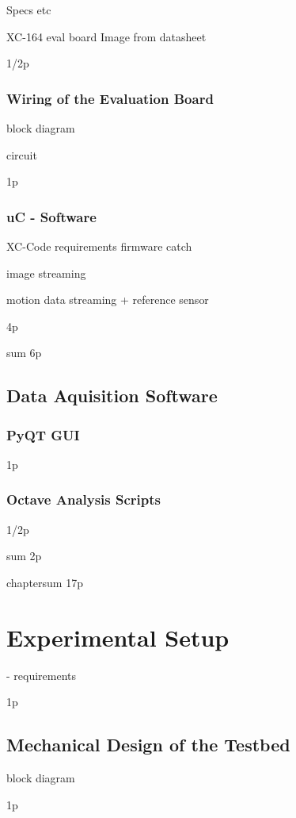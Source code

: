 \documentclass[12pt,a4paper]{article}
\begin{document}
Specs etc

XC-164 eval board 
  Image from datasheet

1/2p

\subsubsection{Wiring of the Evaluation Board}

  block diagram

  circuit

1p

\subsubsection{uC - Software}

  XC-Code
    requirements
    firmware catch

    image streaming

    motion data streaming
      + reference sensor

4p

sum 6p


\subsection{Data Aquisition Software}

\subsubsection{PyQT GUI}
1p

\subsubsection{Octave Analysis Scripts}
1/2p


sum 2p

chaptersum 17p

\section{Experimental Setup}

- requirements

1p

\subsection{Mechanical Design of the Testbed}

block diagram

1p
\end{document}
